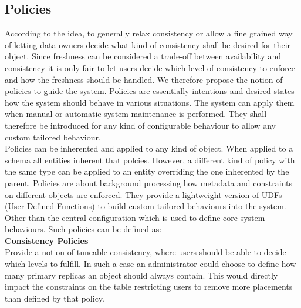 
\subsection{Policies}
\label{sec:polcies}

According to the idea, to generally relax consistency or allow a fine grained way of letting data owners decide what kind of consistency shall be desired for their object. 
Since freshness can be considered a trade-off between availability and consistency it is only fair to let users decide which level of consistency to enforce and 
how the freshness should be handled. We therefore propose the notion of policies to guide the system.
Policies are essentially intentions and desired states how the system should behave in various situations. 
The system can apply them when manual or automatic system maintenance is performed.
They shall therefore be introduced for any kind of configurable behaviour to allow any custom tailored behaviour. \\

Policies can be inherented and applied to any kind of object. When applied to a schema all entities inherent that polcies.
However, a different kind of policy with the same type can be applied to an entity overriding the one inherented by the parent.
Policies are about background processing how metadata and constraints on different objects are enforced. 
They provide a lightweight version of UDFs (User-Defined-Functions) to build custom-tailored behaviours into the system.
Other than the central configuration which is used to define core system behaviours. 
Such policies can be defined as:\\


\textbf{Consistency Policies}\\
Provide a notion of tuneable consistency, where users should be able to decide which levels to fulfill.
In such a case an administrator could choose to define how many primary replicas an object should always contain.
This would directly impact the constraints on the table restricting users to remove more placements than defined by that policy.\\



